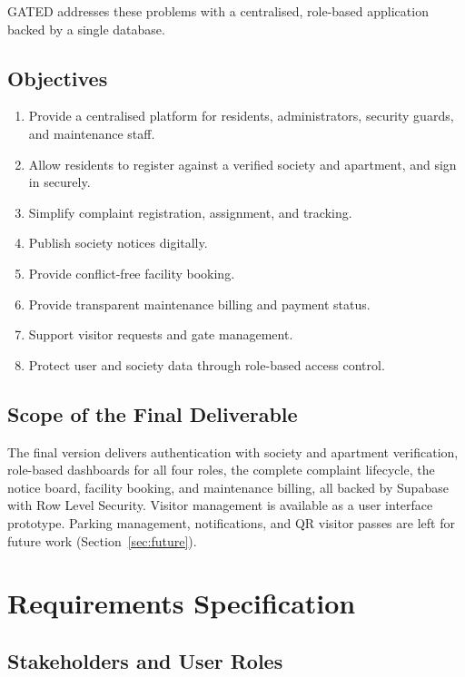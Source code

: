 \documentclass{tietreport}
\renewcommand{\_}{\textunderscore\allowbreak}
\begin{document}
GATED addresses these problems with a centralised, role-based application
backed by a single database.

\subsection{Objectives}

\begin{enumerate}
  \item Provide a centralised platform for residents, administrators,
  security guards, and maintenance staff.
  \item Allow residents to register against a verified society and apartment,
  and sign in securely.
  \item Simplify complaint registration, assignment, and tracking.
  \item Publish society notices digitally.
  \item Provide conflict-free facility booking.
  \item Provide transparent maintenance billing and payment status.
  \item Support visitor requests and gate management.
  \item Protect user and society data through role-based access control.
\end{enumerate}

\subsection{Scope of the Final Deliverable}

The final version delivers authentication with society and apartment
verification, role-based dashboards for all four roles, the complete
complaint lifecycle, the notice board, facility booking, and maintenance
billing, all backed by Supabase with Row Level Security. Visitor management is
available as a user interface prototype. Parking management, notifications,
and QR visitor passes are left for future work
(Section~\ref{sec:future}).


\section{Requirements Specification}

\subsection{Stakeholders and User Roles}
\end{document}
